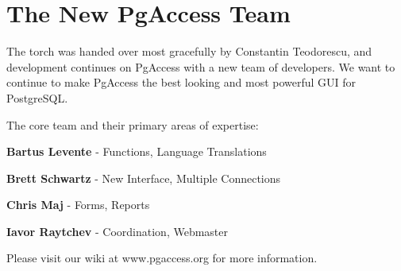 \section{The New PgAccess Team}
The torch was handed over most gracefully by Constantin Teodorescu, and 
development continues on PgAccess with a new team of developers.
We want to continue to make PgAccess the best looking and most powerful 
GUI for PostgreSQL.

The core team and their primary areas of expertise:

\textbf{Bartus Levente}  - Functions, Language Translations

\textbf{Brett Schwartz}  - New Interface, Multiple Connections

\textbf{Chris Maj}       - Forms, Reports

\textbf{Iavor Raytchev}  - Coordination, Webmaster

Please visit our wiki at www.pgaccess.org for more information.
